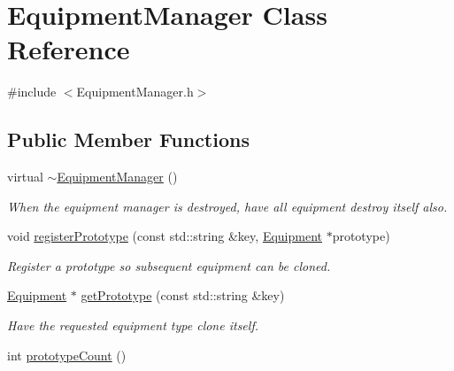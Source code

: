\hypertarget{class_equipment_manager}{}\section{Equipment\+Manager Class Reference}
\label{class_equipment_manager}


{\ttfamily \#include $<$Equipment\+Manager.\+h$>$}

\subsection*{Public Member Functions}
\begin{DoxyCompactItemize}
\item 
\hypertarget{class_equipment_manager_af46a4c47fdf8c30b9f57289b26ce1bb7}{}virtual \hyperlink{class_equipment_manager_af46a4c47fdf8c30b9f57289b26ce1bb7}{$\sim$\+Equipment\+Manager} ()\label{class_equipment_manager_af46a4c47fdf8c30b9f57289b26ce1bb7}

\begin{DoxyCompactList}\small\item\em When the equipment manager is destroyed, have all equipment destroy itself also. \end{DoxyCompactList}\item 
\hypertarget{class_equipment_manager_a9b0b1f9a7bfd3a2f6f175861934d5209}{}void \hyperlink{class_equipment_manager_a9b0b1f9a7bfd3a2f6f175861934d5209}{register\+Prototype} (const std\+::string \&key, \hyperlink{class_equipment}{Equipment} $\ast$prototype)\label{class_equipment_manager_a9b0b1f9a7bfd3a2f6f175861934d5209}

\begin{DoxyCompactList}\small\item\em Register a prototype so subsequent equipment can be cloned. \end{DoxyCompactList}\item 
\hypertarget{class_equipment_manager_a5fa1699c3d15509e0919398ae26996b9}{}\hyperlink{class_equipment}{Equipment} $\ast$ \hyperlink{class_equipment_manager_a5fa1699c3d15509e0919398ae26996b9}{get\+Prototype} (const std\+::string \&key)\label{class_equipment_manager_a5fa1699c3d15509e0919398ae26996b9}

\begin{DoxyCompactList}\small\item\em Have the requested equipment type clone itself. \end{DoxyCompactList}\item 
\hypertarget{class_equipment_manager_a86fe670fb3ca9c3cb5212e5459c3dbd7}{}int \hyperlink{class_equipment_manager_a86fe670fb3ca9c3cb5212e5459c3dbd7}{prototype\+Count} ()\label{class_equipment_manager_a86fe670fb3ca9c3cb5212e5459c3dbd7}


\end{DoxyCompactItemize}
